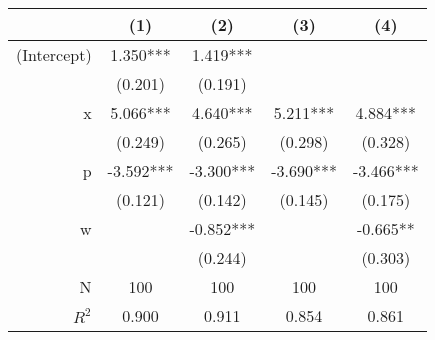 \begin{tabular}{r|cccc}
\toprule
            & (1)       & (2)       & (3)       & (4)       \\ \hline
(Intercept) &  1.350*** &  1.419*** &           &           \\
            &   (0.201) &   (0.191) &           &           \\
          x &  5.066*** &  4.640*** &  5.211*** &  4.884*** \\
            &   (0.249) &   (0.265) &   (0.298) &   (0.328) \\
          p & -3.592*** & -3.300*** & -3.690*** & -3.466*** \\
            &   (0.121) &   (0.142) &   (0.145) &   (0.175) \\
          w &           & -0.852*** &           &  -0.665** \\
            &           &   (0.244) &           &   (0.303) \\ \hline
          N &       100 &       100 &       100 &       100 \\
      $R^2$ &     0.900 &     0.911 &     0.854 &     0.861 \\
\bottomrule
\end{tabular}